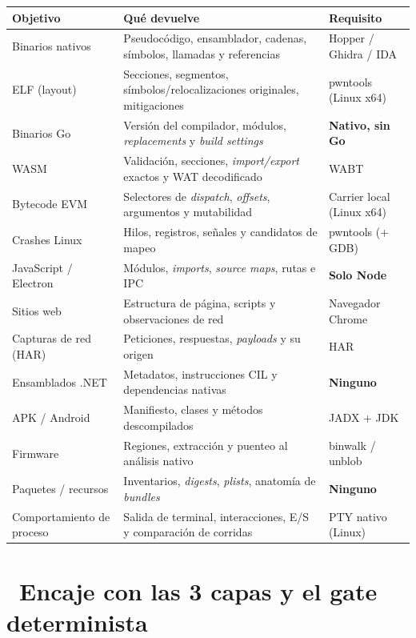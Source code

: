 \documentclass[11pt,a4paper]{article}
\newcommand{\iconotexto}[2]{\textcolor{cyanNeon}{\faIcon{#1}}~#2}
\begin{document}
\begin{longtable}{p{3.4cm} p{7.4cm} p{3.0cm}}
\toprule
\textbf{Objetivo} & \textbf{Qué devuelve} & \textbf{Requisito} \\
\midrule
\endhead
\bottomrule
\endlastfoot
Binarios nativos & Pseudocódigo, ensamblador, cadenas, símbolos, llamadas y referencias &
Hopper / Ghidra / IDA \\
\addlinespace
ELF (layout) & Secciones, segmentos, símbolos/relocalizaciones originales, mitigaciones &
pwntools (Linux x64) \\
\addlinespace
Binarios Go & Versión del compilador, módulos, \emph{replacements} y \emph{build settings} &
\textbf{Nativo, sin Go} \\
\addlinespace
WASM & Validación, secciones, \emph{import/export} exactos y WAT decodificado & WABT \\
\addlinespace
Bytecode EVM & Selectores de \emph{dispatch}, \emph{offsets}, argumentos y mutabilidad &
Carrier local (Linux x64) \\
\addlinespace
Crashes Linux & Hilos, registros, señales y candidatos de mapeo & pwntools (+ GDB) \\
\addlinespace
JavaScript / Electron & Módulos, \emph{imports}, \emph{source maps}, rutas e IPC & \textbf{Solo Node} \\
\addlinespace
Sitios web & Estructura de página, scripts y observaciones de red & Navegador Chrome \\
\addlinespace
Capturas de red (HAR) & Peticiones, respuestas, \emph{payloads} y su origen & HAR \\
\addlinespace
Ensamblados .NET & Metadatos, instrucciones CIL y dependencias nativas & \textbf{Ninguno} \\
\addlinespace
APK / Android & Manifiesto, clases y métodos descompilados & JADX + JDK \\
\addlinespace
Firmware & Regiones, extracción y puenteo al análisis nativo & binwalk / unblob \\
\addlinespace
Paquetes / recursos & Inventarios, \emph{digests}, \emph{plists}, anatomía de \emph{bundles} &
\textbf{Ninguno} \\
\addlinespace
Comportamiento de proceso & Salida de terminal, interacciones, E/S y comparación de corridas &
PTY nativo (Linux) \\
\end{longtable}

\section[Encaje con ELECTRONICA]{\iconotexto{balance-scale}{Encaje con las 3 capas y el gate determinista}}
\end{document}
